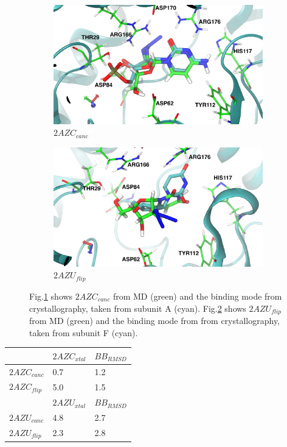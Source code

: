 \begin{figure}[!ht]
\centering
\begin{subfigure}{.5\textwidth}
  \centering
  \includegraphics[width=.9\linewidth]{chapter4/xtal/2AZC_canc-xtal_front.pdf}
  \caption{$2AZC_{canc}$}
  \label{fig:2AZC-xtal}
\end{subfigure}%
\begin{subfigure}{.5\textwidth}
  \centering
  \includegraphics[width=.9\linewidth]{chapter4/xtal/2AZU_flip-xtal_front.pdf}
  \caption{$2AZU_{flip}$}
  \label{fig:2AZU-xtal}
\end{subfigure}
\caption[2AZC/2AZU Comparison to Crystal Structures]{Fig.\ref{fig:2AZC-xtal} shows $2AZC_{canc}$ from MD (green) and the binding mode from crystallography, taken from subunit A (cyan). Fig.\ref{fig:2AZU-xtal} shows $2AZU_{flip}$ from MD (green) and the binding mode from from crystallography, taken from subunit F (cyan). }
\label{fig:xtal}
\end{figure}


\begin{table}[!ht]
\begin{tabular}{|l|l|l|}
\hline
                          & \textbf{$2AZC_{xtal}$} & \textbf{$BB_{RMSD}$} \\ \hline
\textbf{$2AZC_{canc}$} & 0.7                  & 1.2             \\ \hline
\textbf{$2AZC_{flip}$} & 5.0                  & 1.5              \\ \hline
\textbf{}                 & \textbf{$2AZU_{xtal}$} & \textbf{$BB_{RMSD}$} \\ \hline
\textbf{$2AZU_{canc}$} & 4.8                  & 2.7             \\ \hline
\textbf{$2AZU_{flip}$} & 2.3                  & 2.8              \\ \hline
\end{tabular}
\end{table}

